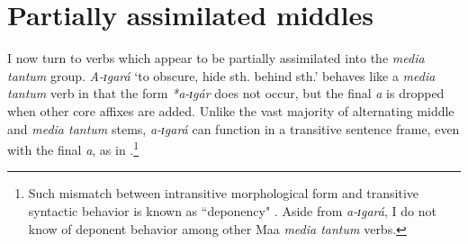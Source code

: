 \documentclass[output=paper,colorlinks,citecolor=brown
]{langscibook}
\begin{document}
\begin{table}
\caption{Selected \textit{media tantum} verbs and situation types}
\label{tab:Payne:MT}
\end{table}

\section{Partially assimilated middles}\label{sec:Payne:PartialAssim}
\largerpage[2]
I now turn to verbs which appear to be partially assimilated into the \textit{media tantum} group. \textit{A-ɪgará} ‘to obscure, hide sth. behind sth.’ behaves like a \textit{media tantum} verb in that the form \textit{*a-ɪgár} does not occur, but the final \textit{a} is dropped when other core affixes are added. Unlike the vast majority of alternating middle and \textit{media tantum} stems, \textit{a-ɪgará} can function in a transitive sentence frame, even with the final \textit{a}, as in .\footnote{Such mismatch between intransitive morphological form and transitive syntactic behavior is known as ``deponency" \citep{Grestenberger2023}. Aside from \textit{a-ɪgará}, I do not know of deponent behavior among other Maa \textit{media tantum} verbs.}
\end{document}
